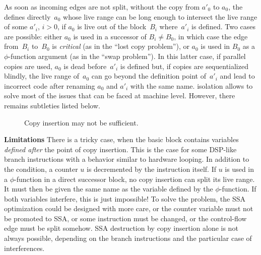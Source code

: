 As soon as incoming edges are not split, without the copy from $a'_0$ to $a_0$, the \phifun defines
directly~$a_0$ whose live range can be long enough to intersect the live range
of some $a'_i$, $i>0$, if $a_0$ is live out of the block~$B_i$ where~$a'_i$ is
defined. Two cases are possible: either $a_0$ is used in a successor of $B_i
\neq B_0$, in which case the edge from~$B_i$ to~$B_0$ is \emph{critical} (as in
the ``lost copy problem''), or $a_0$ is used in $B_0$ as a $\phi$-function
argument (as in the ``swap problem''). In this latter case, if parallel copies
are used, $a_0$ is dead before~$a'_i$ is defined but, if copies are
sequentialized blindly, the live range of~$a_0$ can go beyond the definition
point of~$a'_i$ and lead to incorrect code after renaming $a_0$ and $a'_i$ with
the same name. \phinode isolation allows to solve most of the issues that can be faced at machine level. However, there remains subtleties listed below.

\begin{figure}[t]
\hfill
{}
\hfill
{}
\caption{Copy insertion may not be sufficient.\label{fig:alternative_ssa_destruction:ex_jump_impossible}}
\end{figure}

{\bf Limitations}
There is a  tricky case, when the basic block contains variables
\emph{defined after} the point of copy insertion. This is the case for some
DSP-like branch instructions with a behavior similar to hardware looping. In
addition to the condition, a counter $u$ is decremented by the instruction
itself. If $u$ is used in a $\phi$-function in a direct successor block, no
copy insertion can split its live range. It must then be given the same name as
the variable defined by the $\phi$-function. If both variables interfere, this
is just impossible! To solve the problem, the SSA optimization could be
designed with more care, or the counter variable must not be promoted to SSA,
or some instruction must be changed, or the control-flow edge must be split
somehow.  SSA destruction by
copy insertion alone is not always possible, depending on the branch
instructions and the particular case of interferences.


